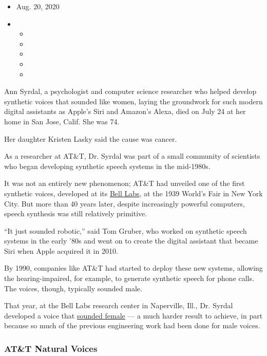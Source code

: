 \begin{itemize}
\item
  Aug. 20, 2020
\item
  \begin{itemize}
  \item
  \item
  \item
  \item
  \item
  \end{itemize}
\end{itemize}

Ann Syrdal, a psychologist and computer science researcher who helped
develop synthetic voices that sounded like women, laying the groundwork
for such modern digital assistants as Apple's Siri and Amazon's Alexa,
died on July 24 at her home in San Jose, Calif. She was 74.

Her daughter Kristen Lasky said the cause was cancer.

As a researcher at AT\&T, Dr. Syrdal was part of a small community of
scientists who began developing synthetic speech systems in the
mid-1980s.

It was not an entirely new phenomenon; AT\&T had unveiled one of the
first synthetic voices, developed at its
\href{https://www.bell-labs.com/about/history-bell-labs/}{Bell Labs}, at
the 1939 World's Fair in New York City. But more than 40 years later,
despite increasingly powerful computers, speech synthesis was still
relatively primitive.

``It just sounded robotic,'' said Tom Gruber, who worked on synthetic
speech systems in the early '80s and went on to create the digital
assistant that became Siri when Apple acquired it in 2010.

By 1990, companies like AT\&T had started to deploy these new systems,
allowing the hearing-impaired, for example, to generate synthetic speech
for phone calls. The voices, though, typically sounded male.

That year, at the Bell Labs research center in Naperville, Ill., Dr.
Syrdal developed a voice that
\href{https://webcache.googleusercontent.com/search?q=cache:oduhdQYYUVsJ:https://www.chicagotribune.com/news/ct-xpm-1990-12-09-9004120037-story.html+\&cd=1\&hl=en\&ct=clnk\&gl=us}{sounded
female} --- a much harder result to achieve, in part because so much of
the previous engineering work had been done for male voices.

\hypertarget{att-natural-voices}{%
\subsubsection{AT\&T Natural Voices}\label{att-natural-voices}}

